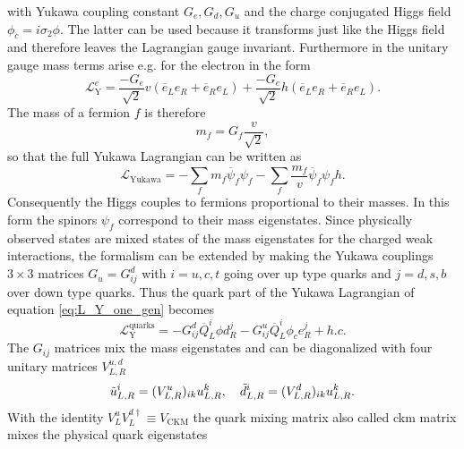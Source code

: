 with Yukawa coupling constant $G_e,G_d,G_u$ and the charge conjugated Higgs field $\phi_c=i\sigma_2\phi$. The latter can be used because it transforms just like the Higgs field and therefore leaves the Lagrangian gauge invariant. Furthermore in the unitary gauge mass terms arise  e.g. for the electron in the form
\begin{equation}
    \mathcal{L}_\mathrm{Y}^e=\frac{-G_e}{\sqrt{2}} v (\overline{e}_L e_R+\overline{e}_R e_L)+\frac{-G_e}{\sqrt{2}} h (\overline{e}_L e_R+\overline{e}_R e_L).
\end{equation}
The mass of a fermion $f$ is therefore
\begin{equation}
    m_f=G_f\frac{v}{\sqrt{2}},
\end{equation}
so that the full Yukawa Lagrangian can be written as
\begin{equation}
    \mathcal{L}_\mathrm{Yukawa}=-\sum_f m_f\overline{\psi}_f \psi_f -\sum_f \frac{m_f}{v}\overline{\psi}_f \psi_f h.
\end{equation}
Consequently the Higgs couples to fermions proportional to their masses. In this form the spinors $\psi_f$ correspond to their mass eigenstates. Since physically observed states are mixed states of the mass eigenstates for the charged weak interactions, the formalism can be extended by making the Yukawa couplings $3\times 3$ matrices $G_u=G_{ij}^d$ with $i=u,c,t$ going over up type quarks and $j=d,s,b$ over down type quarks. Thus the quark part of the Yukawa Lagrangian of equation \ref{eq:L_Y_one_gen} becomes
\begin{equation}
    \mathcal{L}_\mathrm{Y}^{\text{quarks}} =
    -G_{ij}^d \overline{Q}_L^i \phi d_R^j -G_{ij}^u \overline{Q}_L^i \phi_c e_R^j + h.c.
\end{equation}
The $G_{ij}$ matrices mix the mass eigenstates and can be diagonalized with four unitary matrices $V_{L,R}^{u,d}$
\begin{equation}
    \Tilde{u}^i_{L,R}=(V^u_{L,R})_{ik}u^k_{L,R}, \quad \Tilde{d}^i_{L,R}=(V^d_{L,R})_{ik}u^k_{L,R}.
\end{equation}
With the identity $V_L^uV_L^{d\dagger}\equiv V_\mathrm{CKM}$ the quark mixing matrix also called \ac{ckm} matrix mixes the physical quark eigenstates
